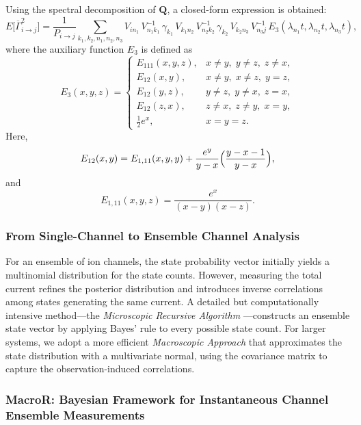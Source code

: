 \documentclass[pdflatex,sn-nature]{sn-jnl}%
\theoremstyle{thmstyleone}%
\theoremstyle{thmstyletwo}%
\theoremstyle{thmstylethree}%
\begin{document}
Using the spectral decomposition of \(\mathbf{Q}\), a closed-form expression is obtained:
	\begin{equation}
	E\bigl[\overline{\Gamma}_{i\rightarrow j}^2\bigr] = \frac{1}{P_{i\rightarrow j}} \sum_{k_1,k_2,n_1,n_2,n_3} V_{i n_1}\,V^{-1}_{n_1 k_1}\,\gamma_{k_1}\,V_{k_1 n_2}\,V^{-1}_{n_2 k_2}\,\gamma_{k_2}\,V_{k_2 n_3}\,V^{-1}_{n_3 j}\,E_3(\lambda_{n_1}t,\lambda_{n_2}t,\lambda_{n_3}t),
\label{eq:expected_square_closed_short}
\end{equation}
where the auxiliary function \(E_3\) is defined as
\begin{equation}
E_3(x,y,z)= 
\begin{cases}
E_{111}(x,y,z), & x\neq y,\; y\neq z,\; z\neq x,\\[1mm]
E_{12}(x,y),   & x\neq y,\; x\neq z,\; y=z,\\[1mm]
	E_{12}(y,z),   & y\neq z,\; y\neq x,\; z=x,\\[1mm]
	E_{12}(z,x),   & z\neq x,\; z\neq y,\; x=y,\\[1mm]
\frac{1}{2}e^x, & x=y=z.
\end{cases}
\label{eq:E3_short}
\end{equation}
Here,
	\begin{equation}
	E_{12}(x,y)= E_{1,11}(x,y,y) + \frac{e^y}{y-x}\Bigl(\frac{y-x-1}{y-x}\Bigr),
		\label{eq:E12_short}
		\end{equation}
		and
		\begin{equation}
		E_{1,11}(x,y,z)= \frac{e^x}{(x-y)(x-z)}.
	\label{eq:E1_11_short}
	\end{equation}
\subsubsection{From Single-Channel to Ensemble Channel Analysis}

For an ensemble of ion channels, the state probability vector initially yields a multinomial distribution for the state counts. However, measuring the total current refines the posterior distribution and introduces inverse correlations among states generating the same current. A detailed but computationally intensive method—the \textit{Microscopic Recursive Algorithm} \cite{Moffatt}—constructs an ensemble state vector by applying Bayes’ rule to every possible state count. For larger systems, we adopt a more efficient \textit{Macroscopic Approach} that approximates the state distribution with a multivariate normal, using the covariance matrix to capture the observation-induced correlations.
\subsubsection{MacroR: Bayesian Framework for Instantaneous Channel Ensemble Measurements}
\end{document}
